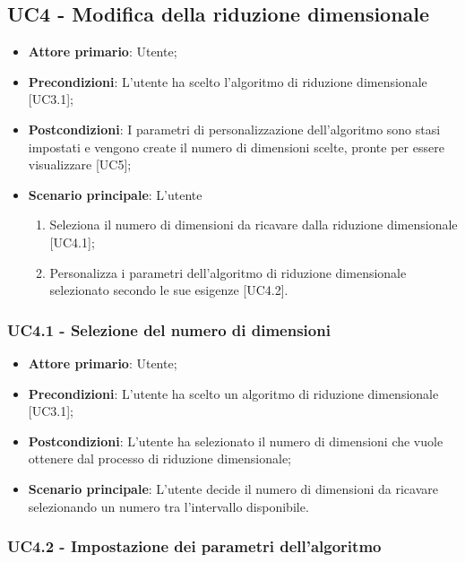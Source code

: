 \subsection{UC4 - Modifica della riduzione dimensionale}
\begin{itemize}
	\item \textbf{Attore primario}: Utente;
	\item \textbf{Precondizioni}: L'utente ha scelto l'algoritmo di riduzione dimensionale [UC3.1];
	\item \textbf{Postcondizioni}: I parametri di personalizzazione dell'algoritmo sono stasi impostati e vengono create il numero di dimensioni scelte, pronte per essere visualizzare [UC5];
	\item \textbf{Scenario principale}: L'utente
	
	\begin{enumerate}
		\item Seleziona il numero di dimensioni da ricavare dalla riduzione dimensionale [UC4.1];
		\item Personalizza i parametri dell'algoritmo di riduzione dimensionale selezionato secondo le sue esigenze [UC4.2].
	\end{enumerate}		
\end{itemize}

\subsubsection{UC4.1 - Selezione del numero di dimensioni}

\begin{itemize}
	\item \textbf{Attore primario}: Utente;
	
	\item \textbf{Precondizioni}: L'utente ha scelto un algoritmo di riduzione dimensionale [UC3.1];
	
	\item \textbf{Postcondizioni}: L'utente ha selezionato il numero di dimensioni che vuole ottenere dal processo di riduzione dimensionale;
	
	\item \textbf{Scenario principale}: L'utente decide il numero di dimensioni da ricavare selezionando un numero tra l'intervallo disponibile.
\end{itemize}	
	
\subsubsection{UC4.2 - Impostazione dei parametri dell'algoritmo}

